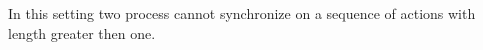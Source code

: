 % 


\begin{example}
  In this setting two process cannot synchronize on a sequence of actions with length greater then one.
% 

\end{example}





